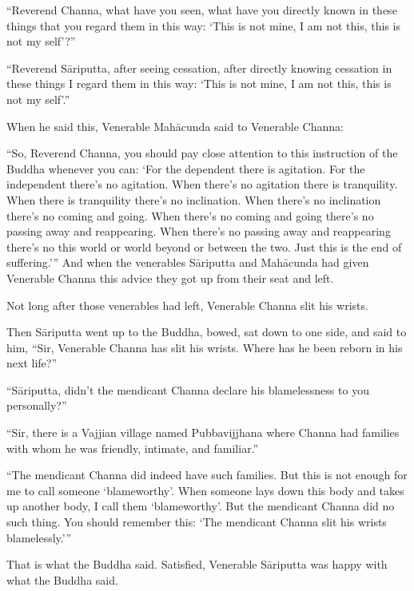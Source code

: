 \documentclass[12pt,openany]{book}%
\begin{document}
“Reverend Channa, what have you seen, what have you directly known in these things that you regard them in this way: ‘This is not mine, I am not this, this is not my self’?” 

“Reverend \textsanskrit{Sāriputta}, after seeing cessation, after directly knowing cessation in these things I regard them in this way: ‘This is not mine, I am not this, this is not my self’.” 

When he said this, Venerable \textsanskrit{Mahācunda} said to Venerable Channa: 

“So, Reverend Channa, you should pay close attention to this instruction of the Buddha whenever you can: ‘For the dependent there is agitation. For the independent there’s no agitation. When there’s no agitation there is tranquility. When there is tranquility there’s no inclination. When there’s no inclination there’s no coming and going. When there’s no coming and going there’s no passing away and reappearing. When there’s no passing away and reappearing there’s no this world or world beyond or between the two. Just this is the end of suffering.’” And when the venerables \textsanskrit{Sāriputta} and \textsanskrit{Mahācunda} had given Venerable Channa this advice they got up from their seat and left. 

Not long after those venerables had left, Venerable Channa slit his wrists. 

Then \textsanskrit{Sāriputta} went up to the Buddha, bowed, sat down to one side, and said to him, “Sir, Venerable Channa has slit his wrists. Where has he been reborn in his next life?” 

“\textsanskrit{Sāriputta}, didn’t the mendicant Channa declare his blamelessness to you personally?” 

“Sir, there is a Vajjian village named Pubbavijjhana where Channa had families with whom he was friendly, intimate, and familiar.” 

“The mendicant Channa did indeed have such families. But this is not enough for me to call someone ‘blameworthy’. When someone lays down this body and takes up another body, I call them ‘blameworthy’. But the mendicant Channa did no such thing. You should remember this: ‘The mendicant Channa slit his wrists blamelessly.’” 

That is what the Buddha said. Satisfied, Venerable \textsanskrit{Sāriputta} was happy with what the Buddha said. 
\end{document}
